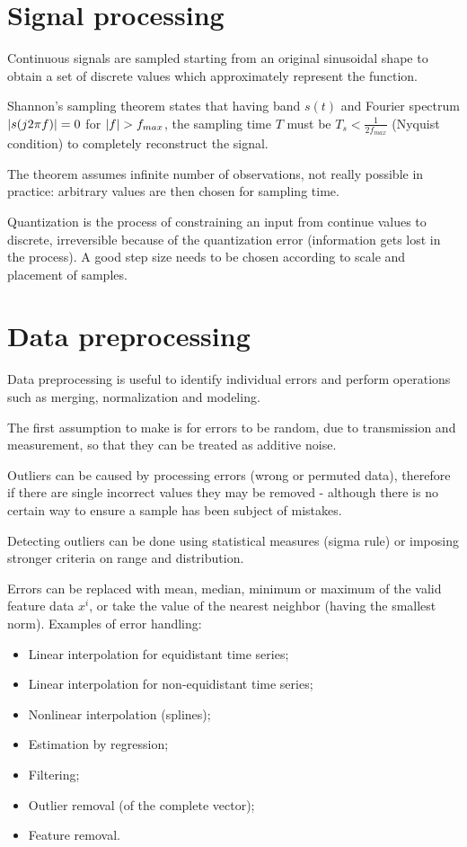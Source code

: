 \section{Signal processing}
Continuous signals are sampled starting from an original sinusoidal shape to obtain a set of discrete values which approximately represent the function. 

Shannon's sampling theorem states that having band $s(t)$ and Fourier spectrum $\left|s(j2\pi f)\right| = 0$ for $\left|f\right| > f_{max}$, the sampling time $T$ must be $T_s < \frac{1}{2f_{max}}$ (Nyquist condition) to completely reconstruct the signal. 

The theorem assumes infinite number of observations, not really possible in practice: arbitrary values are then chosen for sampling time. 

Quantization is the process of constraining an input from continue values to discrete, irreversible because of the quantization error (information gets lost in the process). A good step size needs to be chosen according to scale and placement of samples. 

\section{Data preprocessing}
Data preprocessing is useful to identify individual errors and perform operations such as merging, normalization and modeling.

The first assumption to make is for errors to be random, due to transmission and measurement, so that they can be treated as additive noise. 

Outliers can be caused by processing errors (wrong or permuted data), therefore if there are single incorrect values they may be removed - although there is no certain way to ensure a sample has been subject of mistakes. 

Detecting outliers can be done using statistical measures (sigma rule) or imposing stronger criteria on range and distribution. 

Errors can be replaced with mean, median, minimum or maximum of the valid feature data $x^i$, or take the value of the nearest neighbor (having the smallest norm). Examples of error handling:
\begin{itemize}
	\item Linear interpolation for equidistant time series;
	\item Linear interpolation for non-equidistant time series;
	\item Nonlinear interpolation (splines);
	\item Estimation by regression;
	\item Filtering;
	\item Outlier removal (of the complete vector);
	\item Feature removal.
\end{itemize} 


